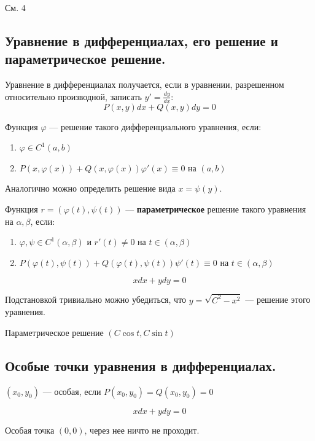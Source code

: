 См. 4

\subsection*{Уравнение в дифференциалах, его решение и параметрическое решение.}

Уравнение в дифференциалах получается, если в уравнении, разрешенном относительно производной, записать \(y' = \frac{dy}{dx} \):
\[P(x, y) dx + Q(x, y) dy = 0\]

Функция \(\varphi\) --- решение такого дифференциального уравнения, если:
\begin{enumerate}
    \item \(\varphi\in C^1(a, b)\)
    \item \(P(x, \varphi(x)) + Q(x, \varphi(x)) \varphi'(x) \equiv 0\) на \((a, b)\)
\end{enumerate}

Аналогично можно определить решение вида \(x = \psi(y)\).

Функция \(r = (\varphi(t), \psi(t))\) --- \textbf{параметрическое} решение такого уравнения на \(\alpha, \beta\), если:
\begin{enumerate}
    \item \(\varphi, \psi\in C^{1}(\alpha, \beta)\) и \(r'(t)\neq 0\) на \(t\in (\alpha, \beta)\)
    \item \(P(\varphi(t), \psi(t)) + Q(\varphi(t), \psi(t))\psi'(t) \equiv 0\) на \(t\in (\alpha, \beta)\)
\end{enumerate}

\begin{example}
    \[xdx + ydy = 0\]

    Подстановкой тривиально можно убедиться, что \(y = \sqrt{C^2 - x^2}\) --- решение этого уравнения.

    Параметрическое решение \((C\cos t, C\sin t)\)
\end{example}

\subsection*{Особые точки уравнения в дифференциалах.}

\((x_0, y_0)\) --- особая, если \(P(x_0, y_0) = Q(x_0, y_0) = 0\)

\begin{example}
    \[xdx + ydy = 0\]

    Особая точка \((0, 0)\), через нее ничто не проходит.
\end{example}

